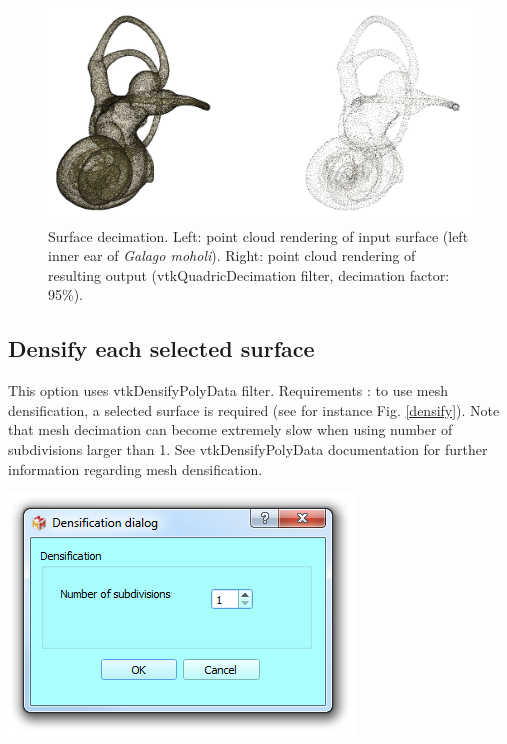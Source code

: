 \begin{figure}
  \centering
  \includegraphics[scale=0.35]{images/09/structure/decimation_example.png} 
	\caption{Surface decimation. Left: point cloud rendering of input surface (left inner ear of \textit{Galago moholi}). Right: point cloud rendering of resulting output (vtkQuadricDecimation filter,
decimation factor: 95\%). 
}
\label{decimate}
 
\end{figure}

\subsection{Densify each selected surface}

\noindent
\begin{minipage}{0.5\textwidth}

This option uses vtkDensifyPolyData filter.
Requirements : to use mesh densification, a selected
surface is required (see for instance Fig. \ref{densify}).
Note that mesh decimation can become extremely slow
when using number of subdivisions larger than 1.
See vtkDensifyPolyData documentation for further information regarding mesh densification.

\end{minipage}    
\begin{minipage}{0.5\textwidth}\centering
  \includegraphics[scale=0.5]{images/09/structure/densification_dialog.png}
 \end{minipage} 
\noindent

